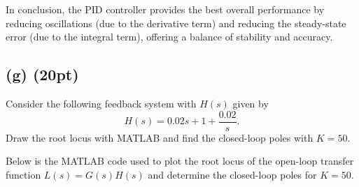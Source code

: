 \documentclass{article}
\begin{document}
In conclusion, the PID controller provides the best overall performance by reducing oscillations (due to the derivative term) and reducing the steady-state error (due to the integral term), offering a balance of stability and accuracy.

\newpage
\subsection*{(g) (20pt)}

Consider the following feedback system with \( H(s) \) given by
\[
H(s) = 0.02s + 1 + \frac{0.02}{s}.
\]
Draw the root locus with MATLAB and find the closed-loop poles with \( K = 50 \).

Below is the MATLAB code used to plot the root locus of the open-loop transfer function \( L(s) = G(s)H(s) \) and determine the closed-loop poles for \( K = 50 \).
\end{document}
